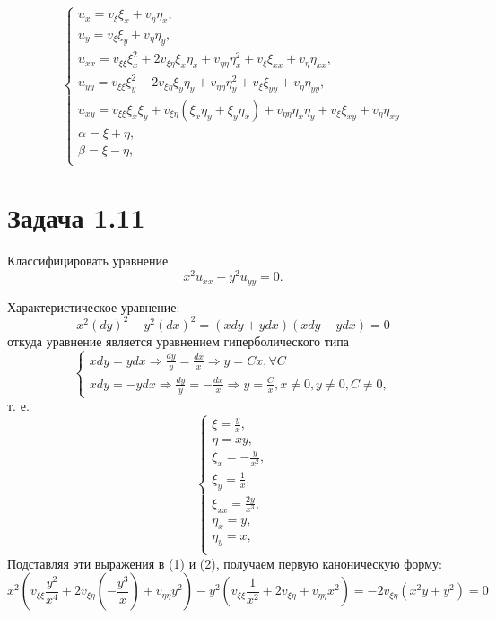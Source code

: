 \documentclass[11pt]{article}
\author{Sergey Makarov}
\date{\today}
\title{}
\begin{document}
\begin{equation}
\begin{cases}
u_x = v_{\xi}\xi_x + v_{\eta}\eta_x, \\
u_y = v_{\xi}\xi_y + v_{\eta}\eta_y, \\
u_{xx} = v_{\xi\xi}\xi_x^2 + 2v_{\xi\eta}\xi_x\eta_x + v_{\eta\eta}\eta_x^2 + v_{\xi}\xi_{xx} + v_{\eta}\eta_{xx}, \\
u_{yy} = v_{\xi\xi}\xi_y^2 + 2v_{\xi\eta}\xi_y\eta_y + v_{\eta\eta}\eta_y^2 + v_{\xi}\xi_{yy} + v_{\eta}\eta_{yy}, \\
u_{xy} = v_{\xi\xi}\xi_x\xi_y + v_{\xi\eta}(\xi_x\eta_y + \xi_y\eta_x) + v_{\eta\eta}\eta_x\eta_y
+ v_{\xi}\xi_{xy} + v_{\eta}\eta_{xy} \\
\alpha = \xi + \eta, \\
\beta = \xi - \eta, \\
\end{cases}
\end{equation}

\section{Задача 1.11}
\label{sec:org8c73d3d}
Классифицировать уравнение
\begin{equation}
x^2u_{xx} - y^2u_{yy} = 0.
\end{equation}

Характеристическое уравнение:
\begin{equation}
x^2(dy)^2 - y^2(dx)^2 = (xdy + ydx)(xdy - ydx) = 0
\end{equation}
откуда уравнение является уравнением гиперболического типа
\begin{equation*}
\begin{cases}
xdy = ydx \Rightarrow \frac{dy}y = \frac{dx}x \Rightarrow y = Cx, \forall C \\
xdy = -ydx \Rightarrow \frac{dy}y = -\frac{dx}x \Rightarrow y = \frac{C}x, x \neq 0, y \neq 0, C \neq 0,
\end{cases}
\end{equation*}
т. е.
\begin{equation*}
\begin{cases}
\xi = \frac{y}x, \\
\eta = xy, \\
\xi_x = -\frac{y}{x^2}, \\
\xi_y = \frac1x, \\
\xi_{xx} = \frac{2y}{x^3}, \\
\eta_x = y, \\
\eta_y = x, \\
\end{cases}
\end{equation*}
Подставляя эти выражения в (1) и (2), получаем первую каноническую форму:
\begin{equation}
x^2\left(v_{\xi\xi}\frac{y^2}{x^4} + 2v_{\xi\eta}\left(-\frac{y^3}x\right) + v_{\eta\eta}y^2\right) -
y^2\left(v_{\xi\xi}\frac1{x^2} + 2v_{\xi\eta} + v_{\eta\eta}x^2\right) = -2v_{\xi\eta}(x^2y + y^2) = 0
\end{equation}
\end{document}
